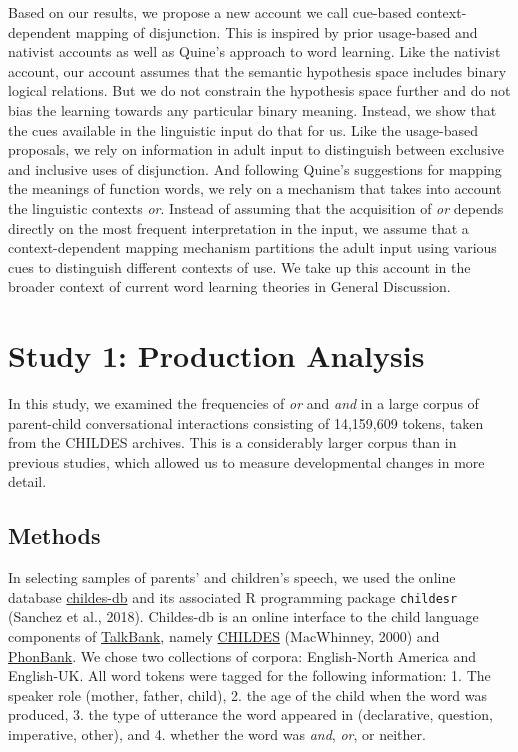 \documentclass[
  english,
  ,man,floatsintext]{apa6}
\begin{document}
Based on our results, we propose a new account we call cue-based context-dependent mapping of disjunction. This is inspired by prior usage-based and nativist accounts as well as Quine's approach to word learning. Like the nativist account, our account assumes that the semantic hypothesis space includes binary logical relations. But we do not constrain the hypothesis space further and do not bias the learning towards any particular binary meaning. Instead, we show that the cues available in the linguistic input do that for us. Like the usage-based proposals, we rely on information in adult input to distinguish between exclusive and inclusive uses of disjunction. And following Quine's suggestions for mapping the meanings of function words, we rely on a mechanism that takes into account the linguistic contexts \emph{or}. Instead of assuming that the acquisition of \emph{or} depends directly on the most frequent interpretation in the input, we assume that a context-dependent mapping mechanism partitions the adult input using various cues to distinguish different contexts of use. We take up this account in the broader context of current word learning theories in General Discussion.

\hypertarget{study-1-production-analysis}{%
\section{Study 1: Production Analysis}\label{study-1-production-analysis}}

In this study, we examined the frequencies of \emph{or} and \emph{and} in a large corpus of parent-child conversational interactions consisting of 14,159,609 tokens, taken from the CHILDES archives. This is a considerably larger corpus than in previous studies, which allowed us to measure developmental changes in more detail.

\hypertarget{methods}{%
\subsection{Methods}\label{methods}}

In selecting samples of parents' and children's speech, we used the online database \href{childes-db.stanford.edu}{childes-db} and its associated R programming package \texttt{childesr} (Sanchez et al., 2018). Childes-db is an online interface to the child language components of \href{https://talkbank.org/}{TalkBank}, namely \href{https://childes.talkbank.org/}{CHILDES} (MacWhinney, 2000) and \href{https://phonbank.talkbank.org/}{PhonBank}. We chose two collections of corpora: English-North America and English-UK. All word tokens were tagged for the following information: 1. The speaker role (mother, father, child), 2. the age of the child when the word was produced, 3. the type of utterance the word appeared in (declarative, question, imperative, other), and 4. whether the word was \emph{and}, \emph{or}, or neither.
\end{document}
